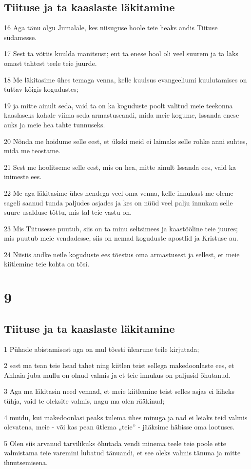 \section*{Tiituse ja ta kaaslaste läkitamine}

\par 16 Aga tänu olgu Jumalale, kes niisuguse hoole teie heaks andis Tiituse südamesse.
\par 17 Sest ta võttis kuulda manitsust; ent ta enese hool oli veel suurem ja ta läks omast tahtest teele teie juurde.
\par 18 Me läkitasime ühes temaga venna, kelle kuulsus evangeeliumi kuulutamises on tuttav kõigis kogudustes;
\par 19 ja mitte ainult seda, vaid ta on ka koguduste poolt valitud meie teekonna kaaslaseks kohale viima seda armastuseandi, mida meie kogume, Issanda enese auks ja meie hea tahte tunnuseks.
\par 20 Nõnda me hoidume selle eest, et ükski meid ei laimaks selle rohke anni suhtes, mida me teostame.
\par 21 Sest me hoolitseme selle eest, mis on hea, mitte ainult Issanda ees, vaid ka inimeste ees.
\par 22 Me aga läkitasime ühes nendega veel oma venna, kelle innukust me oleme sageli saanud tunda paljudes asjades ja kes on nüüd veel palju innukam selle suure usalduse tõttu, mis tal teie vastu on.
\par 23 Mis Tiitusesse puutub, siis on ta minu seltsimees ja kaastööline teie juures; mis puutub meie vendadesse, siis on nemad koguduste apostlid ja Kristuse au.
\par 24 Niisiis andke neile koguduste ees tõestus oma armastusest ja sellest, et meie kiitlemine teie kohta on tõsi.


\chapter{9}

\section*{Tiituse ja ta kaaslaste läkitamine}

\par 1 Pühade abistamisest aga on mul tõesti ülearune teile kirjutada;
\par 2 sest ma tean teie head tahet ning kiitlen teist sellega makedoonlaste ees, et Ahhaia juba mullu on olnud valmis ja et teie innukus on paljusid õhutanud.
\par 3 Aga ma läkitasin need vennad, et meie kiitlemine teist selles asjas ei läheks tühja, vaid te oleksite valmis, nagu ma olen rääkinud;
\par 4 muidu, kui makedoonlasi peaks tulema ühes minuga ja nad ei leiaks teid valmis olevatena, meie - või kas pean ütlema „teie” - jääksime häbisse oma lootuses.
\par 5 Olen siis arvanud tarvilikuks õhutada vendi minema teele teie poole ette valmistama teie varemini lubatud tänuandi, et see oleks valmis tänuna ja mitte ihnutsemisena.

